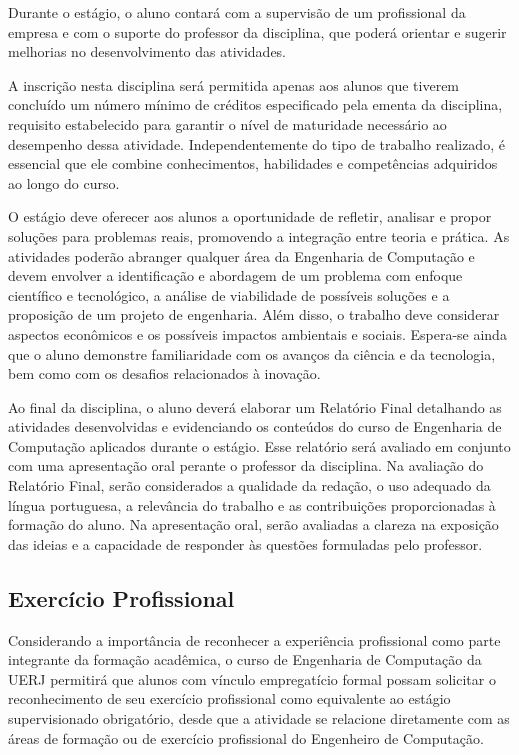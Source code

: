 Durante o estágio, o aluno contará com a supervisão de um profissional da empresa e com o suporte do professor da disciplina, que poderá orientar e sugerir melhorias no desenvolvimento das atividades.

A inscrição nesta disciplina será permitida apenas aos alunos que tiverem concluído um número mínimo de créditos especificado pela ementa da disciplina, requisito estabelecido para garantir o nível de maturidade necessário ao desempenho dessa atividade. Independentemente do tipo de trabalho realizado, é essencial que ele combine conhecimentos, habilidades e competências adquiridos ao longo do curso.

O estágio deve oferecer aos alunos a oportunidade de refletir, analisar e propor soluções para problemas reais, promovendo a integração entre teoria e prática. As atividades poderão abranger qualquer área da Engenharia de Computação e devem envolver a identificação e abordagem de um problema com enfoque científico e tecnológico, a análise de viabilidade de possíveis soluções e a proposição de um projeto de engenharia. Além disso, o trabalho deve considerar aspectos econômicos e os possíveis impactos ambientais e sociais. Espera-se ainda que o aluno demonstre familiaridade com os avanços da ciência e da tecnologia, bem como com os desafios relacionados à inovação.

Ao final da disciplina, o aluno deverá elaborar um Relatório Final detalhando as atividades desenvolvidas e evidenciando os conteúdos do curso de Engenharia de Computação aplicados durante o estágio. Esse relatório será avaliado em conjunto com uma apresentação oral perante o professor da disciplina. Na avaliação do Relatório Final, serão considerados a qualidade da redação, o uso adequado da língua portuguesa, a relevância do trabalho e as contribuições proporcionadas à formação do aluno. Na apresentação oral, serão avaliadas a clareza na exposição das ideias e a capacidade de responder às questões formuladas pelo professor.

\subsection{Exercício Profissional}
Considerando a importância de reconhecer a experiência profissional como parte integrante da formação acadêmica, o curso de Engenharia de Computação da UERJ permitirá que alunos com vínculo empregatício formal possam solicitar o reconhecimento de seu exercício profissional como equivalente ao estágio supervisionado obrigatório, desde que a atividade se relacione diretamente com as áreas de formação ou de exercício profissional do Engenheiro de Computação.

